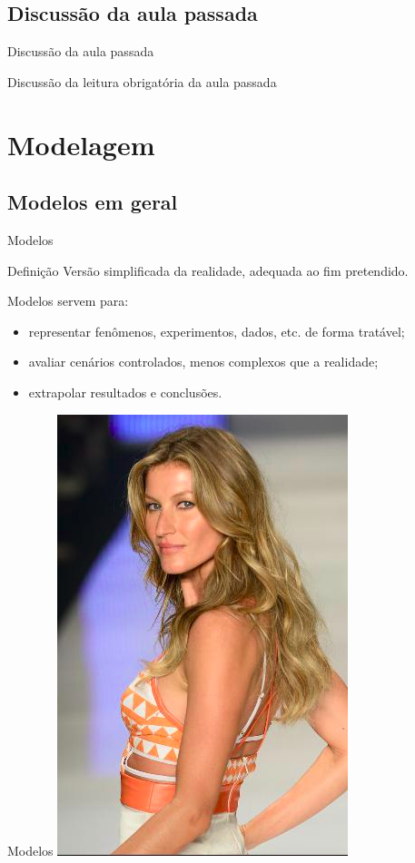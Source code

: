 \documentclass{beamer}
\begin{document}
\subsection{Discussão da aula passada}

\begin{frame}{Discussão da aula passada}
  \begin{block}{}
    Discussão da leitura obrigatória da aula passada
  \end{block}
\end{frame}

\section{Modelagem}

\subsection{Modelos em geral}

\begin{frame}{Modelos}
  \begin{block}{Definição}
    \small
    Versão simplificada da realidade, adequada ao fim pretendido.
  \end{block}
  \bigskip
  \small
  Modelos servem para:
  \begin{itemize}
    \footnotesize
  \item representar fenômenos, experimentos, dados, etc. de forma
    tratável;
  \item avaliar cenários controlados, menos complexos que a realidade;
  \item extrapolar resultados e conclusões.
  \end{itemize}
\end{frame}

\begin{frame}{Modelos}
  \centering
  \includegraphics[height=\textheight]{Cap18-19/gi}
\end{frame}
\end{document}
